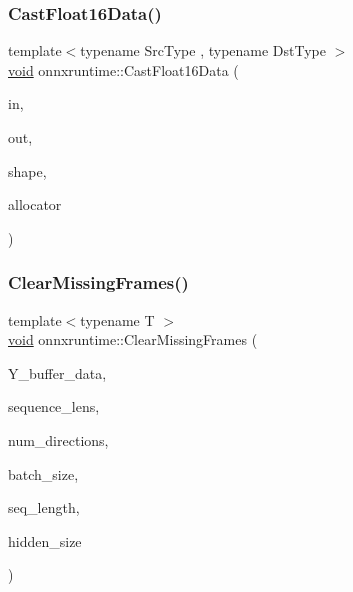 \mbox{\label{namespaceonnxruntime_abecb7a5406c1156a89a5ca13615f338e}} 
\subsubsection{\texorpdfstring{Cast\+Float16\+Data()}{CastFloat16Data()}}
{\footnotesize\ttfamily template$<$typename Src\+Type , typename Dst\+Type $>$ \\
\mbox{\hyperlink{mlasi_8h_a88f941d423cb2a819b70a1358982b1a6}{void}} onnxruntime\+::\+Cast\+Float16\+Data (\begin{DoxyParamCaption}\item[{const \mbox{\hyperlink{classonnxruntime_1_1Tensor}{Tensor}} $\ast$}]{in,  }\item[{\mbox{\hyperlink{classonnxruntime_1_1Tensor}{Tensor}} $\ast$}]{out,  }\item[{const \mbox{\hyperlink{classonnxruntime_1_1TensorShape}{Tensor\+Shape}} \&}]{shape,  }\item[{const \mbox{\hyperlink{namespaceonnxruntime_a6cdac724c5dcefded3a63f08dae58fda}{Allocator\+Ptr}} \&}]{allocator }\end{DoxyParamCaption})\hspace{0.3cm}{\ttfamily [inline]}}

\mbox{\label{namespaceonnxruntime_a0435fb65c7eee9b09ba915e17d51797c}} 
\subsubsection{\texorpdfstring{Clear\+Missing\+Frames()}{ClearMissingFrames()}}
{\footnotesize\ttfamily template$<$typename T $>$ \\
\mbox{\hyperlink{mlasi_8h_a88f941d423cb2a819b70a1358982b1a6}{void}} onnxruntime\+::\+Clear\+Missing\+Frames (\begin{DoxyParamCaption}\item[{T $\ast$}]{Y\+\_\+buffer\+\_\+data,  }\item[{const \mbox{\hyperlink{classonnxruntime_1_1Tensor}{Tensor}} $\ast$}]{sequence\+\_\+lens,  }\item[{int64\+\_\+t}]{num\+\_\+directions,  }\item[{int64\+\_\+t}]{batch\+\_\+size,  }\item[{int64\+\_\+t}]{seq\+\_\+length,  }\item[{int64\+\_\+t}]{hidden\+\_\+size }\end{DoxyParamCaption})}

